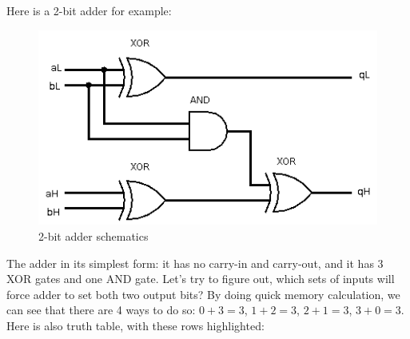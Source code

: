 Here is a 2-bit adder for example:

\begin{figure}[ht!]
\centering
\includegraphics[scale=0.75]{SAT/adder_logisim.png}
\caption{2-bit adder schematics}
\end{figure}

The adder in its simplest form: it has no carry-in and carry-out, and it has 3 XOR gates and one AND gate.
Let's try to figure out, which sets of inputs will force adder to set both two output bits?
By doing quick memory calculation, we can see that there are 4 ways to do so: $0+3=3$, $1+2=3$, $2+1=3$, $3+0=3$.
Here is also truth table, with these rows highlighted:

\newcommand{\HLcell}{\cellcolor{blue!25}}

